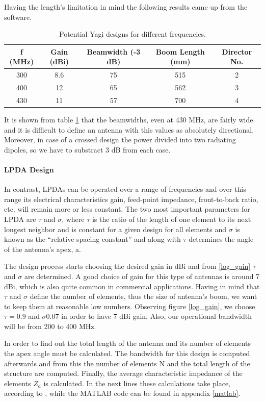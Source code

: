 Having the length's limitation in mind the following results came up from the software.
\begin{table}[htb]
\begin{tabular}{| c | c | c | c | c |}
\hline
 f (MHz) & Gain (dBi) & Beamwidth (-3 dB) & Boom Length (mm) & Director No. \\ 
 \hline
 300 & 8.6 & 75 & 515 & 2 \\  
 \hline
 400 & 12 & 65 & 562 & 3\\
 \hline
  430 & 11 & 57 & 700 & 4 \\
 \hline
\end{tabular}
\caption{Potential Yagi designs for different frequencies.}
\label{table: Yagi}
\end{table}

It is shown from table \ref{table: Yagi} that the beamwidths, even at 430 MHz, are fairly wide and it is difficult to define an antenna with this values as absolutely directional. Moreover, in case of a crossed design the power divided into two radiating dipoles, so we have to substract 3 dB from each case.

\paragraph{LPDA Design}
In contrast, LPDAs can be operated over a range of frequencies and over this range its electrical characteristics gain, feed-point impedance, front-to-back ratio, etc. will remain more or less constant. The two most important parameters for LPDA are $\tau$ and $\sigma$, where $\tau$ is the ratio of the length of one element to its next longest neighbor and is constant for a given design for all elements and $\sigma$ is known as the “relative spacing constant” and along with $\tau$ determines the angle of the antenna’s apex, a. 

The design process starts choosing the desired gain in dBi and from \ref{log_gain} $\tau$ and $\sigma$ are determined. A good choice of gain for this type of antennas is around 7 dBi, which is also quite common in commercial applications. Having in mind that $\tau$ and $\sigma$ define the number of elements, thus the size of antenna's boom, we want to keep them at reasonable low numbers. Observing figure \ref{log_gain}, we choose $\tau=0.9$ and $\sigma0.07$ in order to have 7 dBi gain. Also, our operational bandwidth will be from 200 to 400 MHz.

In order to find out the total length of the antenna and its number of elements the apex angle must be calculated. The bandwidth for this design is computed afterwards and from this the number of elements N and the total length of the structure are computed. Finally, the average characteristic impedance of the elements $Z_{a}$ is calculated. In the next lines these calculations take place, according to \cite{balanis}, while the MATLAB code can be found in appendix \ref{matlab}.

